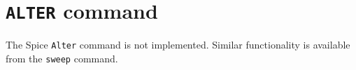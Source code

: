 \section{{\tt ALTER} command}
The Spice {\tt Alter} command is not implemented.  Similar functionality is
available from the {\tt sweep} command.
